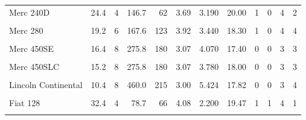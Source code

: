 \documentclass[
  10pt,
]{scrartcl}
\begin{document}
\begin{longtable}[t]{lrrrrrrrrrrr}
Merc 240D & 24.4 & 4 & 146.7 & 62 & 3.69 & 3.190 & 20.00 & 1 & 0 & 4 & 2\\
\cellcolor{gray!10}{Merc 230} & \cellcolor{gray!10}{22.8} & \cellcolor{gray!10}{4} & \cellcolor{gray!10}{140.8} & \cellcolor{gray!10}{95} & \cellcolor{gray!10}{3.92} & \cellcolor{gray!10}{3.150} & \cellcolor{gray!10}{22.90} & \cellcolor{gray!10}{1} & \cellcolor{gray!10}{0} & \cellcolor{gray!10}{4} & \cellcolor{gray!10}{2}\\
Merc 280 & 19.2 & 6 & 167.6 & 123 & 3.92 & 3.440 & 18.30 & 1 & 0 & 4 & 4\\
\addlinespace
\cellcolor{gray!10}{Merc 280C} & \cellcolor{gray!10}{17.8} & \cellcolor{gray!10}{6} & \cellcolor{gray!10}{167.6} & \cellcolor{gray!10}{123} & \cellcolor{gray!10}{3.92} & \cellcolor{gray!10}{3.440} & \cellcolor{gray!10}{18.90} & \cellcolor{gray!10}{1} & \cellcolor{gray!10}{0} & \cellcolor{gray!10}{4} & \cellcolor{gray!10}{4}\\
Merc 450SE & 16.4 & 8 & 275.8 & 180 & 3.07 & 4.070 & 17.40 & 0 & 0 & 3 & 3\\
\cellcolor{gray!10}{Merc 450SL} & \cellcolor{gray!10}{17.3} & \cellcolor{gray!10}{8} & \cellcolor{gray!10}{275.8} & \cellcolor{gray!10}{180} & \cellcolor{gray!10}{3.07} & \cellcolor{gray!10}{3.730} & \cellcolor{gray!10}{17.60} & \cellcolor{gray!10}{0} & \cellcolor{gray!10}{0} & \cellcolor{gray!10}{3} & \cellcolor{gray!10}{3}\\
Merc 450SLC & 15.2 & 8 & 275.8 & 180 & 3.07 & 3.780 & 18.00 & 0 & 0 & 3 & 3\\
\cellcolor{gray!10}{Cadillac Fleetwood} & \cellcolor{gray!10}{10.4} & \cellcolor{gray!10}{8} & \cellcolor{gray!10}{472.0} & \cellcolor{gray!10}{205} & \cellcolor{gray!10}{2.93} & \cellcolor{gray!10}{5.250} & \cellcolor{gray!10}{17.98} & \cellcolor{gray!10}{0} & \cellcolor{gray!10}{0} & \cellcolor{gray!10}{3} & \cellcolor{gray!10}{4}\\
\addlinespace
Lincoln Continental & 10.4 & 8 & 460.0 & 215 & 3.00 & 5.424 & 17.82 & 0 & 0 & 3 & 4\\
\cellcolor{gray!10}{Chrysler Imperial} & \cellcolor{gray!10}{14.7} & \cellcolor{gray!10}{8} & \cellcolor{gray!10}{440.0} & \cellcolor{gray!10}{230} & \cellcolor{gray!10}{3.23} & \cellcolor{gray!10}{5.345} & \cellcolor{gray!10}{17.42} & \cellcolor{gray!10}{0} & \cellcolor{gray!10}{0} & \cellcolor{gray!10}{3} & \cellcolor{gray!10}{4}\\
Fiat 128 & 32.4 & 4 & 78.7 & 66 & 4.08 & 2.200 & 19.47 & 1 & 1 & 4 & 1\\
\cellcolor{gray!10}{Honda Civic} & \cellcolor{gray!10}{30.4} & \cellcolor{gray!10}{4} & \cellcolor{gray!10}{75.7} & \cellcolor{gray!10}{52} & \cellcolor{gray!10}{4.93} & \cellcolor{gray!10}{1.615} & \cellcolor{gray!10}{18.52} & \cellcolor{gray!10}{1} & \cellcolor{gray!10}{1} & \cellcolor{gray!10}{4} & \cellcolor{gray!10}{2}\\

\end{longtable}
\end{document}
